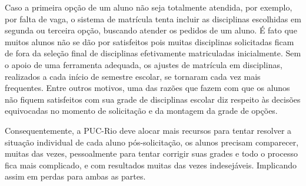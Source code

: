 Caso a primeira opção de um aluno não seja totalmente atendida, por exemplo, por falta de vaga, o sistema de matrícula tenta incluir as disciplinas escolhidas em segunda ou terceira opção, buscando atender os pedidos de um aluno. É fato que muitos alunos não se dão por satisfeitos pois muitas disciplinas solicitadas ficam de fora da seleção final de disciplinas efetivamente matriculadas inicialmente. Sem o apoio de uma ferramenta adequada, os ajustes de matrícula em disciplinas, realizados a cada início de semestre escolar, se tornaram cada vez mais frequentes. Entre outros motivos, uma das razões que fazem com que os alunos não fiquem satisfeitos com sua grade de disciplinas escolar diz respeito às decisões equivocadas no momento de solicitação e da montagem da grade de opções.

Consequentemente, a PUC-Rio deve alocar mais recursos para tentar resolver a situação individual de cada aluno pós-solicitação, os alunos precisam comparecer, muitas das vezes, pessoalmente para tentar corrigir suas grades e todo o processo fica mais complicado, e com resultados muitas das vezes indesejáveis. Implicando assim em perdas para ambas as partes.


